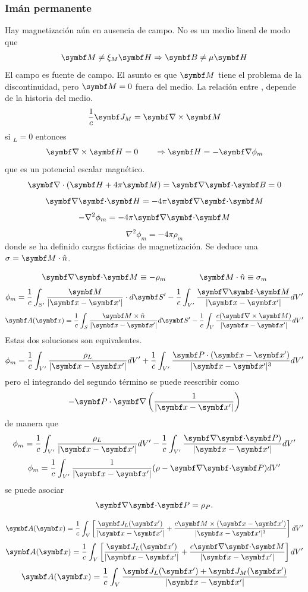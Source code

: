 \documentclass[10pt,oneside]{CBFT_book}
\begin{document}
\subsubsection{Imán permanente}

Hay magnetización  aún en ausencia de campo. No es un medio lineal de modo que
\[
	\vb{M}	 \neq \xi_M \vb{H} \Rightarrow \vb{B} \neq \mu \vb{H}
\]
El campo  es fuente de campo. El asunto es que $\vb{M}$ tiene el problema de
la discontinuidad, pero $ \vb{M} = 0 $ fuera del medio.
La relación entre , depende de la historia del medio.
\[
	\frac{1}{c}\vb{J}_M = \rotorm{M}
\]
si $_L=0$ entonces 
\[
	\rotorm{H} = 0 \qquad \Rightarrow \vb{H} = -\Nabla\phi_m
\]
que es un potencial escalar magnético.
\[
	\Nabla\cdot( \vb{H} + 4\pi\vb{M} ) = \divem{B} = 0
\]
\[
	\divem{H} = -4\pi\divem{M}
\]
\[
	-\nabla^2 \phi_m = -4\pi\divem{M}
\]
\[
	\nabla^2 \phi_m = -4\pi\rho_m
\]
donde se ha definido cargas ficticias de magnetización.
Se deduce una $ \sigma = \vb{M} \cdot \hat{n} $.

\[
	\divem{M} \equiv -\rho_m \qquad \qquad \vb{M}\cdot\hat{n} \equiv \sigma_m
\]
\[
	\phi_m = \frac{1}{c} \int_{S'} \frac{\vb{M}}{|\vb{x}-\vb{x}'|} \cdot d\vb{S}' -
		\frac{1}{c} \int_{V'} \frac{\divem{M}}{|\vb{x}-\vb{x}'|} dV' 
\]
\[
	\vb{A}( \vb{x}) = \frac{1}{c} \int_S \frac{ \vb{M}\times\hat{n} }{|\vb{x}-\vb{x}'|} d\vb{S}' - 
		\frac{1}{c} \int_V \frac{ c(\rotorm{M}) }{|\vb{x}-\vb{x}'|}  dV'
\]
Estas dos soluciones son equivalentes.
\[
	\phi_m = \frac{1}{c} \int_{V'} \frac{\rho_L}{|\vb{x}-\vb{x}'|}  dV' +
		\frac{1}{c} \int_{V'} \frac{ \vb{P}\cdot(\vb{x}-\vb{x}')}{|\vb{x}-\vb{x}'|^3} dV' 
\]
pero el integrando del segundo término se puede reescribir como 
\[
	-\vb{P}\cdot\Nabla\left(\frac{1}{|\vb{x}-\vb{x}'|}\right)
\]
de manera que 
\[
	\phi_m = \frac{1}{c} \int_{V'} \frac{\rho_L}{|\vb{x}-\vb{x}'|}  dV' -
		\frac{1}{c} \int_{V'} \frac{ \divem{P}) }{|\vb{x}-\vb{x}'|} dV' 
\]
\[
	\phi_m = \frac{1}{c} \int_{V'} \frac{1}{|\vb{x}-\vb{x}'|}( \rho - \divem{P} )  dV'
\]
se puede asociar
\[
	\divem{P} = \rho_P.
\]

\[
	\vb{A}( \vb{x}) = \frac{1}{c} \int_V \left[ \frac{ \vb{J}_L(\vb{x}') }{|\vb{x}-\vb{x}'|} +
		\frac{ c \vb{M} \times (\vb{x}-\vb{x}') }{|\vb{x}-\vb{x}'|^3} \right] dV'
\]
\[
	\vb{A}( \vb{x}) = \frac{1}{c} \int_V \left[ \frac{ \vb{J}_L(\vb{x}') }{|\vb{x}-\vb{x}'|} +
		\frac{ c \divem{M} }{|\vb{x}-\vb{x}'|} \right] dV'
\]
\[
	\vb{A}( \vb{x}) = \frac{1}{c} \int_V \frac{ \vb{J}_L(\vb{x}') + \vb{J}_M(\vb{x}' ) }{|\vb{x}-\vb{x}'|}	
\]
\end{document}
